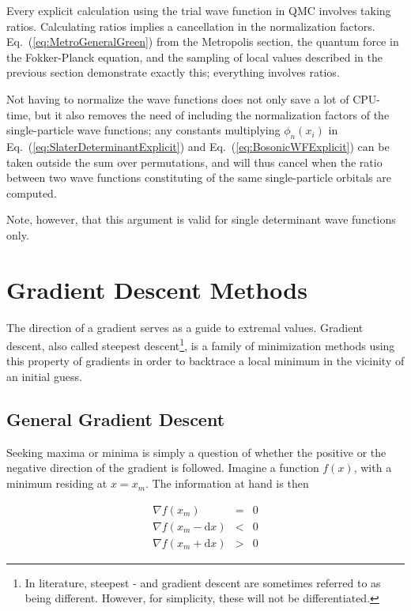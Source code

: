 Every explicit calculation using the trial wave function in QMC involves taking ratios. Calculating ratios implies a cancellation in the normalization factors. Eq.~(\ref{eq:MetroGeneralGreen}) from the Metropolis section, the quantum force in the Fokker-Planck equation, and the sampling of local values described in the previous section demonstrate exactly this; everything involves ratios.

Not having to normalize the wave functions does not only save a lot of CPU-time, but it also removes the need of including the normalization factors of the single-particle wave functions; any constants multiplying $\phi_n(x_i)$ in Eq.~(\ref{eq:SlaterDeterminantExplicit}) and Eq.~(\ref{eq:BosonicWFExplicit}) can be taken outside the sum over permutations, and will thus cancel when the ratio between two wave functions constituting of the same single-particle orbitals are computed. 

Note, however, that this argument is valid for single determinant wave functions only. 

\section{Gradient Descent Methods}
\label{sec:GradientDescent}

The direction of a gradient serves as a guide to extremal values. Gradient descent, also called steepest descent\footnote{In literature, steepest - and gradient descent are sometimes referred to as being different. However, for simplicity, these will not be differentiated.}, is a family of minimization methods using this property of gradients in order to backtrace a local minimum in the vicinity of an initial guess. 

\subsection{General Gradient Descent}

Seeking maxima or minima is simply a question of whether the positive or the negative direction of the gradient is followed.
Imagine a function $f(x)$, with a minimum residing at $x=x_m$. The information at hand is then

\begin{eqnarray}
 \nabla f(x_m) &=& 0 \\
 \nabla f(x_m - \mathrm{d}x) &<& 0 \\
  \nabla f(x_m + \mathrm{d}x) &>& 0
\end{eqnarray}

